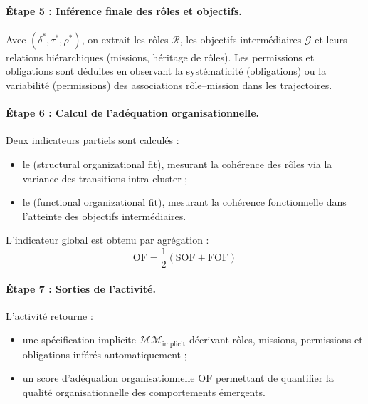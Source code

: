 \paragraph{Étape 5 : Inférence finale des rôles et objectifs.}
Avec $(\delta^*, \tau^*, \rho^*)$, on extrait les rôles $\mathcal{R}$, les objectifs intermédiaires $\mathcal{G}$ et leurs relations hiérarchiques (missions, héritage de rôles).
Les permissions et obligations sont déduites en observant la systématicité (obligations) ou la variabilité (permissions) des associations rôle–mission dans les trajectoires.

\paragraph{Étape 6 : Calcul de l’adéquation organisationnelle.}
Deux indicateurs partiels sont calculés :
\begin{itemize}
    \item le \textbf{} (structural organizational fit), mesurant la cohérence des rôles via la variance des transitions intra-cluster ;
    \item le \textbf{} (functional organizational fit), mesurant la cohérence fonctionnelle dans l’atteinte des objectifs intermédiaires.
\end{itemize}
L’indicateur global est obtenu par agrégation :
\[
    \text{OF} = \frac{1}{2}(\text{SOF} + \text{FOF})
\]

\paragraph{Étape 7 : Sorties de l’activité.}
L’activité retourne :
\begin{itemize}
    \item une spécification implicite $\mathcal{MM}_{\text{implicit}}$ décrivant rôles, missions, permissions et obligations inférés automatiquement ;
    \item un score d’adéquation organisationnelle $\text{OF}$ permettant de quantifier la qualité organisationnelle des comportements émergents.
\end{itemize}


